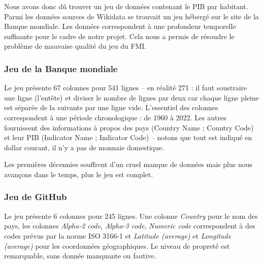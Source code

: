 \documentclass[hidelinks, 12pt]{article}
\begin{document}
\label{banquemondiale}Nous avons donc dû trouver un jeu de données contenant le PIB par habitant. Parmi les données sources de Wikidata se trouvait un jeu hébergé sur le site de la Banque mondiale. Les données correspondent à une profondeur temporelle suffisante pour le cadre de notre projet. Cela nous a permis de résoudre le problème de mauvaise qualité du jeu du FMI.






















\subsubsection{Jeu de la Banque mondiale}

Le jeu présente 67 colonnes pour 541 lignes -- en réalité 271 : il faut soustraire une ligne (l'entête) et diviser le nombre de lignes par deux car chaque ligne pleine est séparée de la suivante par une ligne vide. L'essentiel des colonnes correspondent à une période chronologique : de 1960 à 2022. Les autres fournissent des informations à propos des pays (Country Name ; Country Code) et leur PIB (Indicator Name ; Indicator Code) -- notons que tout est indiqué en dollar courant, il n'y a pas de monnaie domestique.

Les premières décennies souffrent d'un cruel manque de données mais plus nous avançons dans le temps, plus le jeu est complet. 





\subsubsection{Jeu de GitHub}

Le jeu présente 6 colonnes pour 245 lignes. Une colonne \emph{Country} pour le nom des pays, les colonnes \emph{Alpha-2 code}, \emph{Alpha-3 code}, \emph{Numeric code} correspondent à des codes prévus par la norme ISO 3166-1 et \emph{Latitude (average)} et \emph{Longitude (average)} pour les coordonnées géographiques. Le niveau de propreté est remarquable, sans donnée manquante ou fautive.
\end{document}
